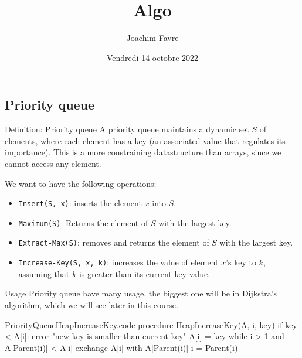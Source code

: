 \documentclass[a4paper]{article}
\title{Algo}
\author{Joachim Favre}
\date{Vendredi 14 octobre 2022}
\begin{document}
\maketitle


\subsection{Priority queue}
\begin{parag}{Definition: Priority queue}
    A priority queue maintains a dynamic set $S$ of elements, where each element has a key (an associated value that regulates its importance). This is a more constraining datastructure than arrays, since we cannot access any element.

    We want to have the following operations:
   \begin{itemize}[left=0pt]
       \item \texttt{Insert(S, x)}: inserts the element $x$ into $S$.
       \item \texttt{Maximum(S)}: Returns the element of $S$ with the largest key.
       \item \texttt{Extract-Max(S)}: removes and returns the element of $S$ with the largest key.
       \item \texttt{Increase-Key(S, x, k)}: increases the value of element $x$'s key to $k$, assuming that $k$ is greater than its current key value.
   \end{itemize}

    \begin{subparag}{Usage}
       Priority queue have many usage, the biggest one will be in Dijkstra's algorithm, which we will see later in this course.
    \end{subparag}
   
\end{parag}


\begin{filecontents*}[overwrite]{PriorityQueueHeapIncreaseKey.code}
procedure HeapIncreaseKey(A, i, key)
    if key < A[i]:
        error "new key is smaller than current key"
    A[i] = key
    while i > 1 and A[Parent(i)] < A[i]
        exchange A[i] with A[Parent(i)]
        i = Parent(i)
\end{filecontents*}
\end{document}
